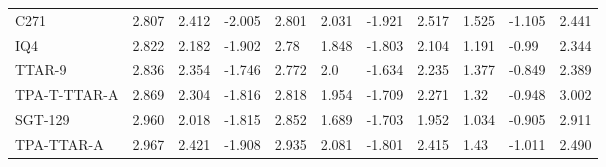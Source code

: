 \begin{tabular}{lrrrllllllr}
          C271 &                  2.807 &                       2.412 &                      -2.005 &                 2.801 &                      2.031 &                     -1.921 &               2.517 &                    1.525 &                   -1.105 & 2.441 \\
           IQ4 &                  2.822 &                       2.182 &                      -1.902 &                  2.78 &                      1.848 &                     -1.803 &               2.104 &                    1.191 &                    -0.99 & 2.344 \\
        TTAR-9 &                  2.836 &                       2.354 &                      -1.746 &                 2.772 &                        2.0 &                     -1.634 &               2.235 &                    1.377 &                   -0.849 & 2.389 \\
  TPA-T-TTAR-A &                  2.869 &                       2.304 &                      -1.816 &                 2.818 &                      1.954 &                     -1.709 &               2.271 &                     1.32 &                   -0.948 & 3.002 \\
       SGT-129 &                  2.960 &                       2.018 &                      -1.815 &                 2.852 &                      1.689 &                     -1.703 &               1.952 &                    1.034 &                   -0.905 & 2.911 \\
    TPA-TTAR-A &                  2.967 &                       2.421 &                      -1.908 &                 2.935 &                      2.081 &                     -1.801 &               2.415 &                     1.43 &                   -1.011 & 2.490 \\
\bottomrule
\end{tabular}
